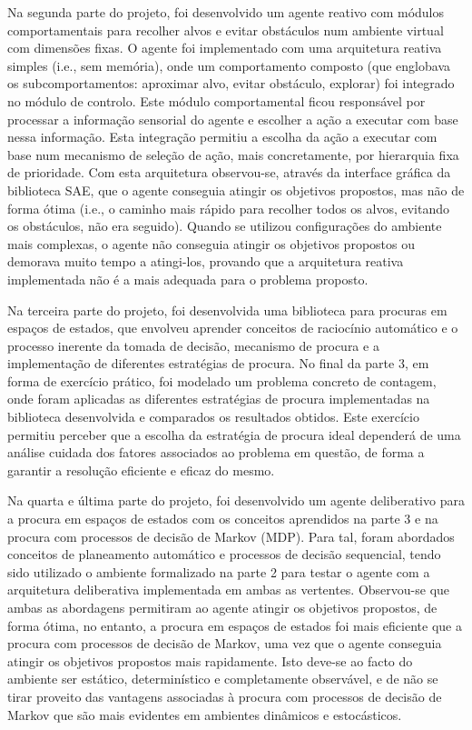 Na segunda parte do projeto, foi desenvolvido um agente reativo com módulos comportamentais para recolher alvos e evitar obstáculos num ambiente virtual com dimensões fixas.
O agente foi implementado com uma arquitetura reativa simples (i.e., sem memória), onde um comportamento composto (que englobava os subcomportamentos: aproximar alvo, evitar obstáculo, explorar) foi integrado no módulo de controlo.
Este módulo comportamental ficou responsável por processar a informação sensorial do agente e escolher a ação a executar com base nessa informação.
Esta integração permitiu a escolha da ação a executar com base num mecanismo de seleção de ação, mais concretamente, por hierarquia fixa de prioridade.
Com esta arquitetura observou-se, através da interface gráfica da biblioteca SAE, que o agente conseguia atingir os objetivos propostos, mas não de forma ótima (i.e., o caminho mais rápido para recolher todos os alvos, evitando os obstáculos, não era seguido).
Quando se utilizou configurações do ambiente mais complexas, o agente não conseguia atingir os objetivos propostos ou demorava muito tempo a atingi-los, provando que a arquitetura reativa implementada não é a mais adequada para o problema proposto.

Na terceira parte do projeto, foi desenvolvida uma biblioteca para procuras em espaços de estados, que envolveu aprender conceitos de raciocínio automático e o processo inerente da tomada de decisão, mecanismo de procura e a implementação de diferentes estratégias de procura.
No final da parte 3, em forma de exercício prático, foi modelado um problema concreto de contagem, onde foram aplicadas as diferentes estratégias de procura implementadas na biblioteca desenvolvida e comparados os resultados obtidos.
Este exercício permitiu perceber que a escolha da estratégia de procura ideal dependerá de uma análise cuidada dos fatores associados ao problema em questão, de forma a garantir a resolução eficiente e eficaz do mesmo.

Na quarta e última parte do projeto, foi desenvolvido um agente deliberativo para a procura em espaços de estados com os conceitos aprendidos na parte 3 e na procura com processos de decisão de Markov (MDP).
Para tal, foram abordados conceitos de planeamento automático e processos de decisão sequencial, tendo sido utilizado o ambiente formalizado na parte 2 para testar o agente com a arquitetura deliberativa implementada em ambas as vertentes.
Observou-se que ambas as abordagens permitiram ao agente atingir os objetivos propostos, de forma ótima, no entanto, a procura em espaços de estados foi mais eficiente que a procura com processos de decisão de Markov, uma vez que o agente conseguia atingir os objetivos propostos mais rapidamente.
Isto deve-se ao facto do ambiente ser estático, determinístico e completamente observável, e de não se tirar proveito das vantagens associadas à procura com processos de decisão de Markov que são mais evidentes em ambientes dinâmicos e estocásticos.

